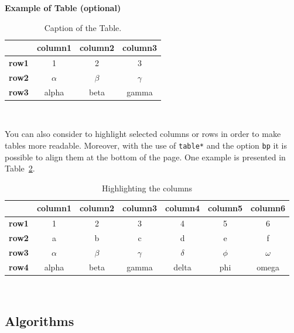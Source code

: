 \documentclass[11pt,a4paper]{article}
\begin{document}
        \begin{table}[H]
            \caption*{\textbf{Example of Table (optional)}}
            \centering 
            \begin{tabular}{|p{3em} c c c |}
            \hline
            \rowcolor{bluePoli!40}
            & \textbf{column1} & \textbf{column2} & \textbf{column3} \T\B \\
            \hline \hline
            \textbf{row1} & 1 & 2 & 3 \T\B \\
            \textbf{row2} & $\alpha$ & $\beta$ & $\gamma$ \T\B\\
            \textbf{row3} & alpha & beta & gamma \B\\
            \hline
            \end{tabular}
            \\[10pt]
            \caption{Caption of the Table.}
            \label{table:example}
        \end{table}

        You can also consider to highlight selected columns or rows in order to make tables more readable. Moreover, with the use of \texttt{table*} and the option \texttt{bp} it is possible to align them at the bottom of the page. One example is presented in Table~\ref{table:exampleC}. 

        \begin{table}[bp]
        \centering 
            \begin{tabular}{|p{3em} | c | c | c | c | c | c|}
            \hline
            & \textbf{column1} & \textbf{column2} & \textbf{column3} & \textbf{column4} & \textbf{column5} & \textbf{column6} \T\B \\
            \hline \hline
            \textbf{row1} & 1 & 2 & 3 & 4 & 5 & 6 \T\B\\
            \textbf{row2} & a & b & c & d & e & f \T\B\\
            \textbf{row3} & $\alpha$ & $\beta$ & $\gamma$ & $\delta$ & $\phi$ & $\omega$ \T\B\\
            \textbf{row4} & alpha & beta & gamma & delta & phi & omega \B\\
            \hline
            \end{tabular}
            \\[10pt]
            \caption{Highlighting the columns}
            \label{table:exampleC}
        \end{table}

    \subsection{Algorithms} \label{subsec:algorithms}
\end{document}
